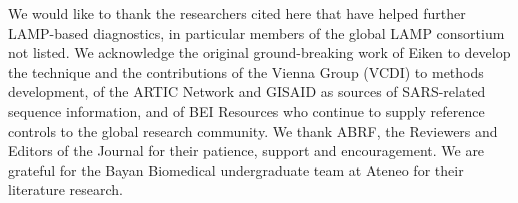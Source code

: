 We would like to thank the researchers cited here that have helped further LAMP-based diagnostics, in particular members of the global LAMP consortium not listed. We acknowledge the original ground-breaking work of Eiken to develop the technique and the contributions of the Vienna Group (VCDI) to methods development, of the ARTIC Network and GISAID as sources of SARS-related sequence information, and of BEI Resources who continue to supply reference controls to the global research community. We thank ABRF, the Reviewers and Editors of the Journal for their patience, support and encouragement. We are grateful for the Bayan Biomedical undergraduate team at Ateneo for their literature research.